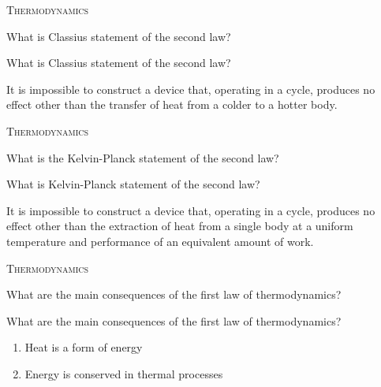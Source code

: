\documentclass{article}
\newenvironment{flashcard}[2][]
  {\noindent\textsc{\Large#1}\par\vfill
   {\centering\Large#2\par}
   \vfill
   \newpage\Large\centering
  }
  {\newpage}
\begin{document}



\begin{flashcard}[Thermodynamics]{What is Classius statement of the second law?}
What is Classius statement of the second law?

\small{It is impossible to construct a device that, operating in a cycle, produces no effect other than the transfer of heat from a colder to a hotter body.}


\end{flashcard}





\begin{flashcard}[Thermodynamics]{What is the Kelvin-Planck statement of the second law?}
What is Kelvin-Planck statement of the second law?

\small{It is impossible to construct a device that, operating in a cycle, produces no effect other than the extraction of heat from a single body at a uniform temperature 
and performance of an equivalent amount of work.}


\end{flashcard}



\begin{flashcard}[Thermodynamics]{What are the main consequences of the first law of thermodynamics?}
What are the main consequences of the first law of thermodynamics?

\begin{enumerate}
\item Heat is a form of energy
\item Energy is conserved in thermal processes
\end{enumerate}


\end{flashcard}
\end{document}
